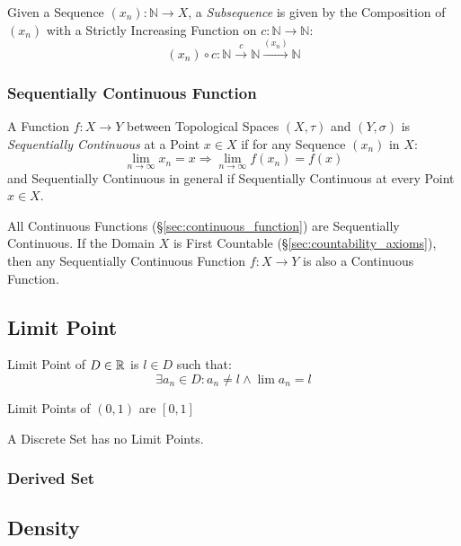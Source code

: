 Given a Sequence $(x_n) : \mathbb{N} \rightarrow X$, a
\emph{Subsequence} is given by the Composition of $(x_n)$ with a
Strictly Increasing Function on $c : \mathbb{N} \rightarrow
\mathbb{N}$:
\[
  (x_n) \circ c :
  \mathbb{N} \xrightarrow{c} \mathbb{N} \xrightarrow{(x_n)} \mathbb{N}
\]



\subsubsection{Sequentially Continuous Function}
\label{sec:sequentially_continuous}

A Function $f : X \rightarrow Y$ between Topological Spaces $(X,
\tau)$ and $(Y, \sigma)$ is \emph{Sequentially Continuous} at a Point
$x \in X$ if for any Sequence $(x_n)$ in $X$:
\[
  \lim_{n \rightarrow \infty} x_n = x
  \Rightarrow \lim_{n \rightarrow \infty} f(x_n) = f(x)
\]
and Sequentially Continuous in general if Sequentially Continuous at
every Point $x \in X$.

All Continuous Functions (\S\ref{sec:continuous_function}) are
Sequentially Continuous. If the Domain $X$ is First Countable
(\S\ref{sec:countability_axioms}), then any Sequentially Continuous
Function $f : X \rightarrow Y$ is also a Continuous Function.



\subsection{Limit Point}\label{sec:limit_point}

Limit Point of $D \in \mathbb{R}$ is $l \in D$ such that:
\[
  \exists a_n \in D : a_n \neq l \wedge \lim a_n = l
\]

Limit Points of $(0,1)$ are $[0,1]$

A Discrete Set has no Limit Points. %



\subsubsection{Derived Set}\label{sec:derived_set}



\subsection{Density}\label{sec:density}

